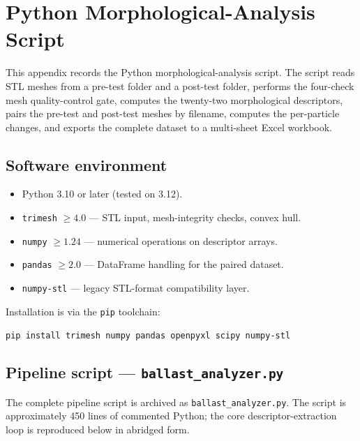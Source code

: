 \chapter{Python Morphological-Analysis Script}
\label{app:script}

This appendix records the Python morphological-analysis script. The script reads STL meshes from a pre-test folder and a post-test folder, performs the four-check mesh quality-control gate, computes the twenty-two morphological descriptors, pairs the pre-test and post-test meshes by filename, computes the per-particle changes, and exports the complete dataset to a multi-sheet Excel workbook.

\section{Software environment}
\label{sec:appB-env}

\begin{itemize}[leftmargin=2em]
  \item Python 3.10 or later (tested on 3.12).
  \item \texttt{trimesh} $\ge 4.0$ --- STL input, mesh-integrity checks, convex hull.
  \item \texttt{numpy} $\ge 1.24$ --- numerical operations on descriptor arrays.
  \item \texttt{pandas} $\ge 2.0$ --- DataFrame handling for the paired dataset.
  \item \texttt{numpy-stl} --- legacy STL-format compatibility layer.
\end{itemize}

Installation is via the \texttt{pip} toolchain:
\begin{center}
\texttt{pip install trimesh numpy pandas openpyxl scipy numpy-stl}
\end{center}

\section{Pipeline script --- \texttt{ballast\_analyzer.py}}
\label{sec:appB-script}

The complete pipeline script is archived as \texttt{ballast\_analyzer.py}. The script is approximately 450 lines of commented Python; the core descriptor-extraction loop is reproduced below in abridged form.

